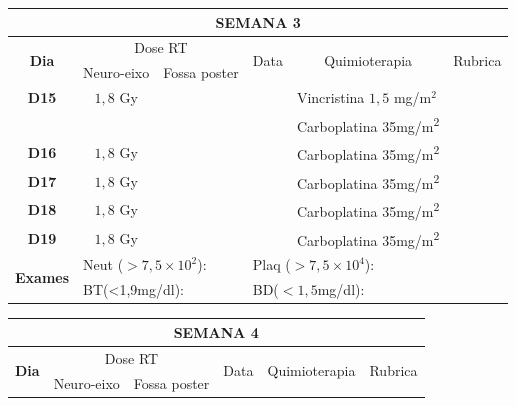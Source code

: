 \documentclass[11pt,a4paper,oldfontcommands]{memoir}
\begin{document}
\begin{center}
\begin{longtable}{p{1cm}p{2cm}|p{2cm}|p{1cm}|p{4cm}|p{3cm}}
	\hline
	\multicolumn{6}{c}{\textbf{SEMANA 3}}\\
\hline
    \multicolumn{1}{c|}{\multirow{2}{*}{\textbf{Dia}}}&\multicolumn{2}{c|}{Dose RT}&\multicolumn{1}{c|}{\multirow{2}{*}{Data}}&\multicolumn{1}{c|}{\multirow{2}{*}{Quimioterapia}}&\multicolumn{1}{c}{\multirow{2}{*}{Rubrica}} \\
    \cline{2-3}
    \multicolumn{1}{c|}{\multirow{1}{*}{}}&{Neuro-eixo}&{Fossa poster}&& \\
	\hline
	\multicolumn{1}{c|}{\multirow{1}{*}{\textbf{D15}}}&\multicolumn{1}{c|}{\(1,8\) Gy}&&&{Vincristina \(1,5\) mg/m\(^2\)}&\\
	\multicolumn{1}{c|}{\multirow{1}{*}{\textbf{}}}&\multicolumn{1}{c|}{}&&&{Carboplatina 35mg/m\textsuperscript{2}}&\\
    \multicolumn{1}{c|}{\multirow{1}{*}{\textbf{D16}}}&\multicolumn{1}{c|}{\(1,8\) Gy}&&&{Carboplatina 35mg/m\textsuperscript{2}}&\\
    \multicolumn{1}{c|}{\multirow{1}{*}{\textbf{D17}}}&\multicolumn{1}{c|}{\(1,8\) Gy}&&&{Carboplatina 35mg/m\textsuperscript{2}}&\\
    \multicolumn{1}{c|}{\multirow{1}{*}{\textbf{D18}}}&\multicolumn{1}{c|}{\(1,8\) Gy}&&&{Carboplatina 35mg/m\textsuperscript{2}}&\\
    \multicolumn{1}{c|}{\multirow{1}{*}{\textbf{D19}}}&\multicolumn{1}{c|}{\(1,8\) Gy}&&&{Carboplatina 35mg/m\textsuperscript{2}}&\\
    \hline
    \multicolumn{1}{c|}{\multirow{2}{*}{\textbf{Exames}}}&\multicolumn{2}{l|}{Neut (\(>7,5\times10^2\)):}&\multicolumn{2}{l|}{Plaq (\(>7,5\times10^4\)):}&\\
    \cline{2-6}
    \multicolumn{1}{c|}{\multirow{2}{*}{{}}}&\multicolumn{2}{l|}{BT(<1,9mg/dl):}&\multicolumn{2}{l|}{BD(\(<1,5\)mg/dl):}&
    \\
    \hline
\end{longtable}
\clearpage
\begin{longtable}{p{1cm}p{2cm}|p{2cm}|p{1cm}|p{4cm}|p{3cm}}
	\hline
	\multicolumn{6}{c}{\textbf{SEMANA 4}}\\
\hline
    \multicolumn{1}{c|}{\multirow{2}{*}{\textbf{Dia}}}&\multicolumn{2}{c|}{Dose RT}&\multicolumn{1}{c|}{\multirow{2}{*}{Data}}&\multicolumn{1}{c|}{\multirow{2}{*}{Quimioterapia}}&\multicolumn{1}{c}{\multirow{2}{*}{Rubrica}} \\
    \cline{2-3}
    \multicolumn{1}{c|}{\multirow{1}{*}{}}&{Neuro-eixo}&{Fossa poster}&& \\

\end{longtable}
\end{center}
\end{document}
